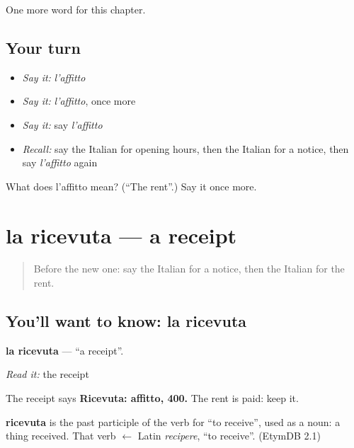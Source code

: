 \begin{grammarlens}[title={What you've built}]
One more word for this chapter.
\end{grammarlens}

\subsection*{Your turn}
\begin{itemize}
\raggedright
  \item \emph{Say it:} \emph{l'affitto}
  \item \emph{Say it:} \emph{l'affitto}, once more
  \item \emph{Say it:} say \emph{l'affitto}
  \item \emph{Recall:} say the Italian for opening hours, then the Italian for a notice, then say \emph{l'affitto} again
\end{itemize}

\begin{tcolorbox}[breakable,colback=teal!4,colframe=teal!35!black,title={Before you move on}]
What does l'affitto mean? (\textquotedblleft{}The rent\textquotedblright{}.) Say it once more.
\end{tcolorbox}
\section[la ricevuta]{la ricevuta — a receipt}

\label{lesson:IT-C139-la-ricevuta}



\begin{quote}
Before the new one: say the Italian for a notice, then the Italian for the rent.
\end{quote}

\subsection*{You'll want to know: la ricevuta}
\textbf{la ricevuta} — \textquotedblleft{}a receipt\textquotedblright{}.

\emph{Read it:} the receipt

The receipt says \textbf{Ricevuta: affitto, 400.} The rent is paid: keep it.

\begin{cousinweb}
\textbf{ricevuta} is the past participle of the verb for \textquotedblleft{}to receive\textquotedblright{}, used as a noun: a thing received. That verb $\leftarrow$ Latin \emph{recipere}, \textquotedblleft{}to receive\textquotedblright{}. (EtymDB 2.1)
\end{cousinweb}

